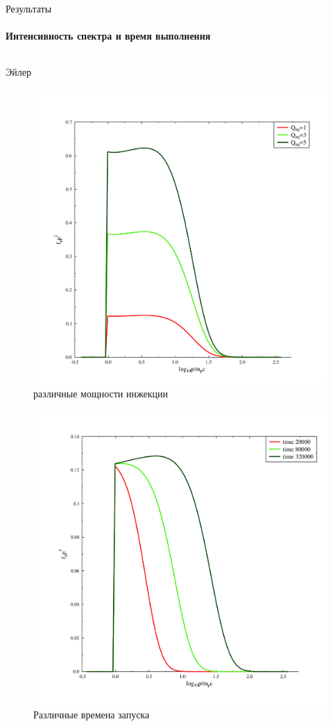 \documentclass[8pt,pdf,hyperref={unicode},serif]{beamer}
\begin{document}
\begin{frame}{Результаты}
\framesubtitle{Интенсивность спектра и время выполнения}
\begin{columns}
\begin{column}{0.5\textwidth}
Эйлер
\begin{figure}[H]
\centering
\includegraphics[width=0.40\linewidth]{r_Qinj}
\caption{различные мощности инжекции}
\end{figure}
\begin{figure}[H]
\centering
\includegraphics[width=0.40\linewidth]{r_times}
\caption{Различные времена запуска}
\end{figure}
\end{column}


\end{columns}
\end{frame}
\end{document}
